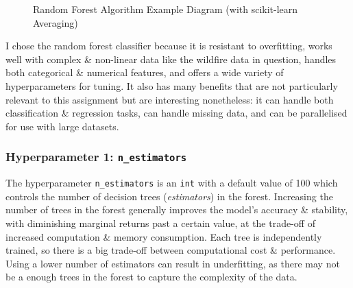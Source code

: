 \documentclass[a4paper, 10pt]{article}
\begin{document}
\begin{figure}[H]
\centering
{}
\caption{Random Forest Algorithm Example Diagram (with scikit-learn Averaging)}
\end{figure}

I chose the random forest classifier because it is resistant to overfitting, works well with complex \& non-linear data like the wildfire data in question, handles both categorical \& numerical features, and offers a wide variety of hyperparameters for tuning.
It also has many benefits that are not particularly relevant to this assignment but are interesting nonetheless: it can handle both classification \& regression tasks, can handle missing data, and can be parallelised for use with large datasets.

\subsubsection{Hyperparameter 1: \texttt{n_estimators}}
The hyperparameter \texttt{n_estimators} is an \texttt{int} with a default value of 100 which controls the number of decision trees (\textit{estimators}) in the forest\supercite{scikit_randomforestclassifier}.
Increasing the number of trees in the forest generally improves the model's accuracy \& stability, with diminishing marginal returns past a certain value, at the trade-off of increased computation \& memory consumption.
Each tree is independently trained, so there is a big trade-off between computational cost \& performance.
Using a lower number of estimators can result in underfitting, as there may not be a enough trees in the forest to capture the complexity of the data.
\end{document}
